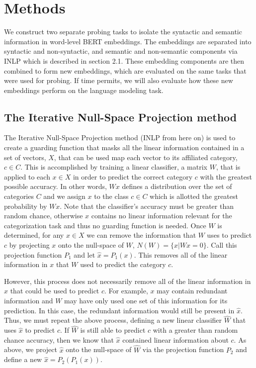 \documentclass[11pt,a4paper]{article}
\begin{document}
\section{Methods}
\label{sec:method}

We construct two separate probing tasks to isolate the syntactic and semantic information in word-level BERT embeddings. The embeddings are separated into syntactic and non-syntactic, and semantic and non-semantic components via INLP which is described in section 2.1. These embedding components are then combined to form new embeddings, which are evaluated on the same tasks that were used for probing. If time permits, we will also evaluate how these new embeddings perform on the language modeling task. 

\subsection{The Iterative Null-Space Projection method}

The Iterative Null-Space Projection method (INLP from here on) is used to create a guarding function that masks all the linear information contained in a set of vectors, $X$, that can be used map each vector to its affiliated category, $c \in C$. This is accomplished by training a linear classifier, a matrix $W$, that is applied to each $x \in X$ in order to predict the correct category $c$ with the greatest possible accuracy. In other words, $Wx$ defines a distribution over the set of categories $C$ and we assign $x$ to the class $c \in C$ which is allotted the greatest probability by $Wx$. Note that the classifier's accuracy must be greater than random chance, otherwise $x$ contains no linear information relevant for the categorization task and thus no guarding function is needed. Once $W$ is determined, for any $x \in X$ we can remove the information that $W$ uses to predict $c$ by projecting $x$ onto the null-space of $W$, $N(W) = \{x | Wx=0\}$. Call this projection function $P_1$ and let $\hat{x} = P_1(x)$. This removes all of the linear information in $x$ that $W$ used to predict the category $c$. 

However, this process does not necessarily remove all of the linear information in $x$ that could be used to predict $c$. For example, $x$ may contain redundant information and $W$ may have only used one set of this information for its prediction. In this case, the redundant information would still be present in $\hat{x}$. Thus, we must repeat the above process, defining a new linear classifier $\hat{W}$ that uses $\hat{x}$  to predict $c$. If $\hat{W}$ is still able to predict $c$ with a greater than random chance accuracy, then we know that $\hat{x}$ contained linear information about $c$. As above, we project $\hat{x}$ onto the null-space of $\hat{W}$ via the projection function $P_2$ and define a new $\hat{x} = P_2(P_1(x))$.
\end{document}
